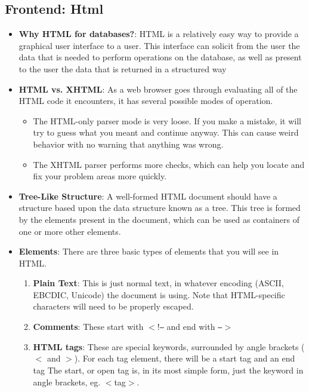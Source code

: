 \documentclass{report}
\begin{document}
    \pagebreak 
    \subsection{Frontend: Html}
    \begin{itemize}
        \item \textbf{Why HTML for databases?}: HTML is a relatively easy way to provide a graphical user interface to a user. This interface can solicit from the user the data that is needed to perform operations on the database, as well as present to the user the data that is returned in a structured way
        \item \textbf{HTML vs. XHTML}: As a web browser goes through evaluating all of the HTML code it encounters, it has several possible modes of operation.
            \begin{itemize}
                \item The HTML-only parser mode is very loose. If you make a mistake, it will try to guess what you meant and continue anyway. This can cause weird behavior with no warning that anything was wrong.
                \item The XHTML parser performs more checks, which can help you locate and fix your problem areas more quickly.
            \end{itemize}
        \item \textbf{Tree-Like Structure}: A well-formed HTML document should have a structure based upon the data structure known as a tree. This tree is formed by the elements present in the document, which can be used as containers of one or more other elements.
        \item \textbf{Elements}: There are three basic types of elements that you will see in HTML.
            \begin{enumerate}
                \item \textbf{Plain Text}: This is just normal text, in whatever encoding (ASCII, EBCDIC, Unicode) the document is using. Note that HTML-specific characters will need to be properly escaped.
                \item \textbf{Comments}: These start with $<$!\texttt{--} and end with \texttt{--}$>$
                \item  \textbf{HTML tags}: These are special keywords, surrounded by angle brackets ( $<$ and $>$). For each tag element, there will be a start tag and an end tag
                    \bigbreak \noindent 
                    The start, or open tag is, in its most simple form, just the keyword in angle brackets, eg. $<$tag$>$.

\end{enumerate}
\end{itemize}
\end{document}

